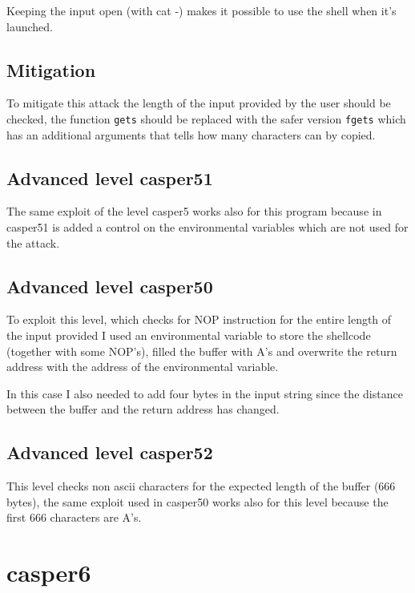 \documentclass[a4paper,12pt]{article}
\begin{document}
Keeping the input open (with cat -) makes it possible to use the shell when it's launched.


\subsection{Mitigation}

To mitigate this attack the length of the input provided by the user should be checked, the function \texttt{gets} should be replaced with the safer version \texttt{fgets} which has an additional arguments that tells how many characters can by copied.

\subsection{Advanced level casper51}
The same exploit of the level casper5 works also for this program because in casper51 is added a control on the environmental variables which are not used for the attack. 


\subsection{Advanced level casper50}

To exploit this level, which checks for NOP instruction for the entire length of the input provided I used an environmental variable to store the shellcode (together with some NOP's), filled the buffer with A's and overwrite the return address with the address of the environmental variable.

In this case I also needed to add four bytes in the input string since the distance between the buffer and the return address has changed.

\subsection{Advanced level casper52}

This level checks non ascii characters for the expected length of the buffer (666 bytes), the same exploit used in casper50 works also for this level because the first 666 characters are A's.

\section{casper6}
\end{document}
